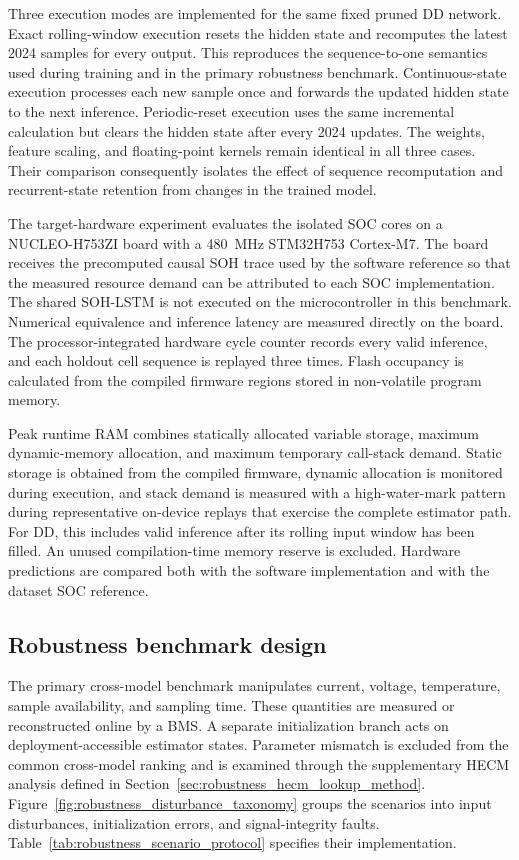 Three execution modes are implemented for the same fixed pruned DD network. Exact rolling-window execution resets the hidden state and recomputes the latest 2024 samples for every output. This reproduces the sequence-to-one semantics used during training and in the primary robustness benchmark. Continuous-state execution processes each new sample once and forwards the updated hidden state to the next inference. Periodic-reset execution uses the same incremental calculation but clears the hidden state after every 2024 updates. The weights, feature scaling, and floating-point kernels remain identical in all three cases. Their comparison consequently isolates the effect of sequence recomputation and recurrent-state retention from changes in the trained model.

The target-hardware experiment evaluates the isolated SOC cores on a NUCLEO-H753ZI board with a \SI{480}{\mega\hertz} STM32H753 Cortex-M7. The board receives the precomputed causal SOH trace used by the software reference so that the measured resource demand can be attributed to each SOC implementation. The shared SOH-LSTM is not executed on the microcontroller in this benchmark. Numerical equivalence and inference latency are measured directly on the board. The processor-integrated hardware cycle counter records every valid inference, and each holdout cell sequence is replayed three times. Flash occupancy is calculated from the compiled firmware regions stored in non-volatile program memory.

Peak runtime RAM combines statically allocated variable storage, maximum dynamic-memory allocation, and maximum temporary call-stack demand. Static storage is obtained from the compiled firmware, dynamic allocation is monitored during execution, and stack demand is measured with a high-water-mark pattern during representative on-device replays that exercise the complete estimator path. For DD, this includes valid inference after its rolling input window has been filled. An unused compilation-time memory reserve is excluded. Hardware predictions are compared both with the software implementation and with the dataset SOC reference.

\subsection{Robustness benchmark design}

The primary cross-model benchmark manipulates current, voltage, temperature, sample availability, and sampling time. These quantities are measured or reconstructed online by a BMS. A separate initialization branch acts on deployment-accessible estimator states. Parameter mismatch is excluded from the common cross-model ranking and is examined through the supplementary HECM analysis defined in Section~\ref{sec:robustness_hecm_lookup_method}. Figure~\ref{fig:robustness_disturbance_taxonomy} groups the scenarios into input disturbances, initialization errors, and signal-integrity faults. Table~\ref{tab:robustness_scenario_protocol} specifies their implementation.\autocite{bergerBenchmarkingBatteryManagement2024}

